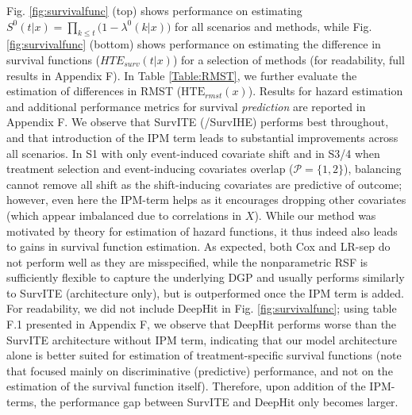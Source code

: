 \documentclass{article}
\begin{document}
Fig. \ref{fig:survivalfunc} (top) shows performance on estimating $S^0(t|x)= \prod\nolimits_{k \leq t}\big(1 - \lambda^{0}(k| x)\big)$ for all scenarios and methods, while Fig. \ref{fig:survivalfunc} (bottom) shows performance on estimating the difference in survival functions ($HTE_{surv}(t|x)$) for a selection of methods (for readability, full results in Appendix F). In Table \ref{Table:RMST}, we further evaluate the estimation of differences in RMST ($\text{HTE}_{rmst}(x)$).  
Results for hazard estimation and additional performance metrics for survival \textit{prediction} are reported in Appendix F. We observe that SurvITE (/SurvIHE) performs best throughout, and that introduction of the IPM term leads to substantial improvements across all scenarios. In S1 with only event-induced covariate shift and in S3/4 when treatment selection and event-inducing covariates overlap ($\mathcal{P}{=}\{1, 2\}$), balancing cannot remove all shift as the shift-inducing covariates are predictive of outcome; however, even here the IPM-term helps as it encourages dropping other covariates (which appear imbalanced due to correlations in $X$). While our method was motivated by theory for estimation of hazard functions, it thus indeed also leads to gains in survival function estimation. 
As expected, both Cox and LR-sep do not perform well as they are misspecified, while the nonparametric RSF is sufficiently flexible to capture the underlying DGP and usually performs similarly to SurvITE (architecture only), but is outperformed once the IPM term is added. For readability, we did not include DeepHit in Fig. \ref{fig:survivalfunc}; using table F.1 presented in Appendix F, we  observe that DeepHit performs worse than the SurvITE architecture without IPM term, indicating that our model architecture alone is better suited for estimation of treatment-specific survival functions (note that \cite{Changhee:AAAI18} focused mainly on discriminative (predictive) performance, and not on the estimation of the survival function itself). Therefore, upon addition of the IPM-terms, the performance gap between SurvITE and DeepHit only becomes larger.
\end{document}
